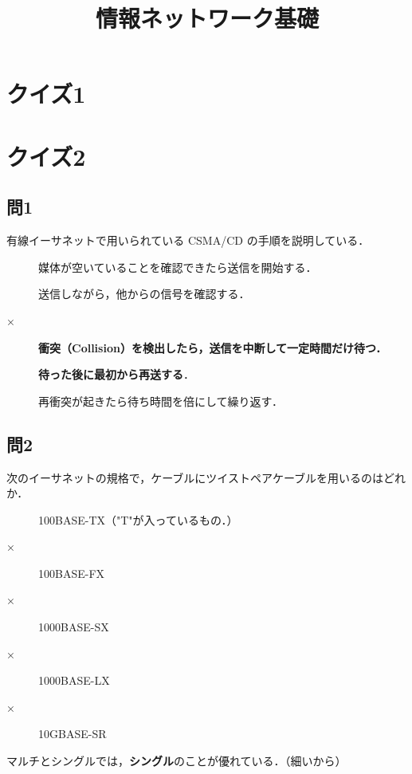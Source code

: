 \documentclass[paper=a4,10pt,twocolumn]{jlreq}
\title{\vspace{-2cm}情報ネットワーク基礎}
\author{}
\date{}
\begin{document}
\newcommand{\ci}{◯}
\newcommand{\bt}{×}
\section*{クイズ1}

\newpage
\section*{クイズ2}
\subsection*{問1}
有線イーサネットで用いられている CSMA/CD の手順を説明している．
\begin{description}
    \item[\ci] 媒体が空いていることを確認できたら送信を開始する．
    \item[\ci] 送信しながら，他からの信号を確認する．
    \item[\bt] \textbf{衝突（Collision）を検出したら，送信を中断して一定時間だけ待つ．}
    \item[\ci] \textbf{待った後に最初から再送する}．
    \item[\ci] 再衝突が起きたら待ち時間を倍にして繰り返す．
\end{description}
\subsection*{問2}
次のイーサネットの規格で，ケーブルにツイストペアケーブルを用いるのはどれか．
\begin{description}
    \item[\ci] 100BASE-TX（"T"が入っているもの．）
    \item[\bt] 100BASE-FX
    \item[\bt] 1000BASE-SX
    \item[\bt] 1000BASE-LX
    \item[\bt] 10GBASE-SR
\end{description}
マルチとシングルでは，\textbf{シングル}のことが優れている．（細いから）
\end{document}
